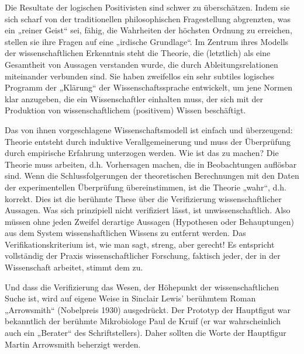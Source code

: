 \documentclass[11pt,a4paper]{article}
\begin{document}
Die Resultate der logischen Positivisten sind schwer zu überschätzen. Indem
sie sich scharf von der traditionellen philosophischen Fragestellung
abgrenzten, was ein „reiner Geist“ sei, fähig, die Wahrheiten der höchsten
Ordnung zu erreichen, stellen sie ihre Fragen auf eine „irdische Grundlage“.
Im Zentrum ihres Modells der wissenschaftlichen Erkenntnis steht die Theorie,
die (letztlich) als eine Gesamtheit von Aussagen verstanden wurde, die durch
Ableitungsrelationen miteinander verbunden sind.  Sie haben zweifellos ein
sehr subtiles logisches Programm der „Klärung“ der Wissenschaftssprache
entwickelt, um jene Normen klar anzugeben, die ein Wissenschaftler einhalten
muss, der sich mit der Produktion von wissenschaftlichem (positivem) Wissen
beschäftigt.

Das von ihnen vorgeschlagene Wissenschaftsmodell ist einfach und überzeugend:
Theorie entsteht durch induktive Verallgemeinerung und muss der Überprüfung
durch empirische Erfahrung unterzogen werden. Wie ist das zu machen? Die
Theorie muss arbeiten, d.h. Vorhersagen machen, die in Beobachtungen
auf\-lösbar sind. Wenn die Schlussfolgerungen der theoretischen Berechnungen
mit den Daten der experimentellen Überprüfung übereinstimmen, ist die Theorie
„wahr“, d.h.  korrekt. Dies ist die berühmte These über die Verifizierung
wissenschaftlicher Aussagen. Was sich prinzipiell nicht verifiziert lässt, ist
unwissenschaftlich.  Also müssen ohne jeden Zweifel derartige Aussagen
(Hypothesen oder Behauptungen) aus dem System wissenshaftlichen Wissens zu
entfernt werden. Das Verifikationskriterium ist, wie man sagt, streng, aber
gerecht! Es entspricht vollständig der Praxis wissenschaftlicher Forschung,
faktisch jeder, der in der Wissenschaft arbeitet, stimmt dem zu.

Und dass die Verifizierung das Wesen, der Höhepunkt der wissenschaftlichen
Suche ist, wird auf eigene Weise in Sinclair Lewis' berühmtem Roman
„Arrowsmith“ (Nobelpreis 1930) ausgedrückt. Der Prototyp der Hauptfigut war
bekanntlich der berühmte Mikrobiologe Paul de Kruif (er war wahrscheinlich
auch ein „Berater“ des Schriftstellers). Daher sollten die Worte der
Hauptfigur Martin Arrowsmith beherzigt werden.
\end{document}
